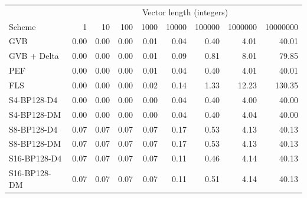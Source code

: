 \begin{tabular}{lrrrrrrrr}
\toprule
 & \multicolumn{8}{c}{Vector length (integers)} \\
Scheme & 1 & 10 & 100 & 1000 & 10000 & 100000 & 1000000 & 10000000 \\
\midrule
GVB & 0.00 & 0.00 & 0.00 & 0.01 & 0.04 & 0.40 & 4.01 & 40.01 \\
GVB + Delta & 0.00 & 0.00 & 0.00 & 0.01 & 0.09 & 0.81 & 8.01 & 79.85 \\
PEF & 0.00 & 0.00 & 0.00 & 0.01 & 0.04 & 0.40 & 4.01 & 40.01 \\
FLS & 0.00 & 0.00 & 0.00 & 0.02 & 0.14 & 1.33 & 12.23 & 130.35 \\
S4-BP128-D4 & 0.00 & 0.00 & 0.00 & 0.00 & 0.04 & 0.40 & 4.00 & 40.00 \\
S4-BP128-DM & 0.00 & 0.00 & 0.00 & 0.00 & 0.04 & 0.40 & 4.04 & 40.00 \\
S8-BP128-D4 & 0.07 & 0.07 & 0.07 & 0.07 & 0.17 & 0.53 & 4.13 & 40.13 \\
S8-BP128-DM & 0.07 & 0.07 & 0.07 & 0.07 & 0.17 & 0.53 & 4.13 & 40.13 \\
S16-BP128-D4 & 0.07 & 0.07 & 0.07 & 0.07 & 0.11 & 0.46 & 4.14 & 40.13 \\
S16-BP128-DM & 0.07 & 0.07 & 0.07 & 0.07 & 0.11 & 0.51 & 4.14 & 40.13 \\
\bottomrule
\end{tabular}
